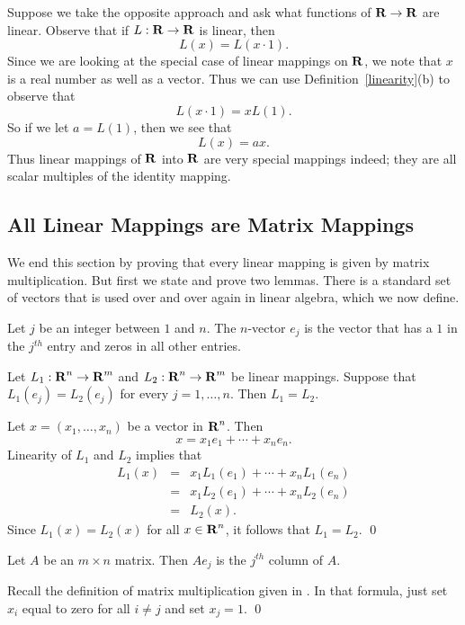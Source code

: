 Suppose we take the opposite approach and ask what functions of
$\mbox{$\bf{R}$}\to\mbox{$\bf{R}$}$ are linear.  Observe that if $L:\mbox{$\bf{R}$}\to\mbox{$\bf{R}$}$ is linear,
then
\[
L(x) = L(x\cdot 1).
\]
Since we are looking at the special case of linear mappings on
$\mbox{$\bf{R}$}$, we note that $x$ is a real number as well as a vector.
Thus we can use Definition~\ref{linearity}(b) to observe that
\[
L(x\cdot 1)=xL(1).
\]
So if we let $a=L(1)$, then we see that
\[
L(x)=ax.
\]
Thus linear mappings of $\mbox{$\bf{R}$}$ into $\mbox{$\bf{R}$}$ are very special mappings
indeed; they are all scalar multiples of the identity mapping.

\subsection*{All Linear Mappings are Matrix Mappings}

We end this section by proving that every linear mapping is
given by matrix multiplication. But first we state and prove two
lemmas.  There is a standard set of vectors that is used over
and over again in linear algebra, which we now define.

\begin{Def}  \label{D:canonicalbasis}
Let $j$ be an integer between $1$ and $n$.  The $n$-vector $e_j$ is
the vector that has a $1$ in the $j^{th}$ entry and zeros in all
other entries.
\end{Def} 

\begin{lemma}  \label{linequal}
Let $L_1:\mbox{$\bf{R}$}^n\to\mbox{$\bf{R}$}^m$ and $L_2:\mbox{$\bf{R}$}^n\to\mbox{$\bf{R}$}^m$ be linear mappings.
Suppose that $L_1(e_j)=L_2(e_j)$ for every $j=1,\ldots,n$.  Then
$L_1=L_2$.
\end{lemma}

\proof  Let $x=(x_1,\ldots,x_n)$ be a vector in $\mbox{$\bf{R}$}^n$.  Then
\[
x = x_1e_1 + \cdots + x_ne_n.
\]
Linearity of $L_1$ and $L_2$ implies that
\begin{eqnarray*}
L_1(x) & = & x_1L_1(e_1) + \cdots + x_nL_1(e_n) \\
  & = & x_1L_2(e_1) + \cdots + x_nL_2(e_n) \\
  & = & L_2(x).
\end{eqnarray*}
Since $L_1(x)=L_2(x)$ for all $x\in\mbox{$\bf{R}$}^n$, it follows that
$L_1=L_2$.  \qed

\begin{lemma}  \label{columnsA}
Let $A$ be an $m\times n$ matrix.  Then $Ae_j$ is the $j^{th}$
column of $A$.
\end{lemma}

\proof  Recall the definition of matrix multiplication given in .
In that formula, just set $x_i$ equal to zero for all $i\neq j$ and set
$x_j=1$. \qed

